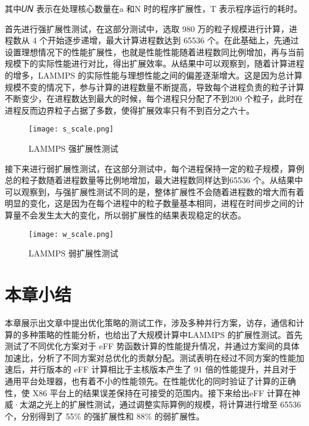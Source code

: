 其中𝑈𝑁 表示在处理核心数量在a 和N 时的程序扩展性，T 表示程序运行的耗时。

首先进行强扩展性测试，在这部分测试中，选取 980 万的粒子规模进行计算，进程数从 4 个开始逐步递增，最大计算进程数达到 65536 个。在此基础上，先通过设置理想情况下的性能扩展性，也就是性能性能随着进程数同比例增加，再与当前规模下的实际性能进行对比，得出扩展效率。从结果中可以观察到，随着计算进程的增多，LAMMPS 的实际性能与理想性能之间的偏差逐渐增大。这是因为总计算规模不变的情况下，参与计算的进程数量不断提高，导致每个进程负责的粒子计算不断变少，在进程数达到最大的时候，每个进程只分配了不到200 个粒子，此时在进程反而边界粒子占据了多数，使得扩展效率只有不到百分之六十。

 \begin{figure}[h]
  \centering
  \texttt{[image: s\_scale.png]}
  \caption{LAMMPS 强扩展性测试}
\end{figure}

 接下来进行弱扩展性测试，在这部分测试中，每个进程保持一定的粒子规模，算例总的粒子数随着进程数量等比例地增加，最大进程数同样达到65536 个。从结果中可以观察到，与强扩展性测试不同的是，整体扩展性不会随着进程数的增大而有着明显的变化，这是因为在每个进程中的粒子数量基本相同，进程在时间步之间的计算量不会发生太大的变化，所以弱扩展性的结果表现稳定的状态。

  \begin{figure}[h]
  \centering
  \texttt{[image: w\_scale.png]}
  \caption{LAMMPS 弱扩展性测试}
\end{figure}

\section{本章小结}
本章展示出文章中提出优化策略的测试工作，涉及多种并行方案，访存，通信和计算的多种策略的性能分析，也给出了大规模计算中LAMMPS 的扩展性测试。首先测试了不同优化方案对于 eFF 势函数计算的性能提升情况，并通过方案间的具体加速比，分析了不同方案对总优化的贡献分配。测试表明在经过不同方案的性能加速后，并行版本的 eFF 计算相比于主核版本产生了 91 倍的性能提升，并且对于通用平台处理器，也有着不小的性能领先。在性能优化的同时验证了计算的正确性，使 X86 平台上的结果误差保持在可接受的范围内。接下来给出eFF 计算在神威·太湖之光上的扩展性测试，通过调整实际算例的规模，将计算进行增至 65536 个，分别得到了 55\% 的强扩展性和 88\% 的弱扩展性。
